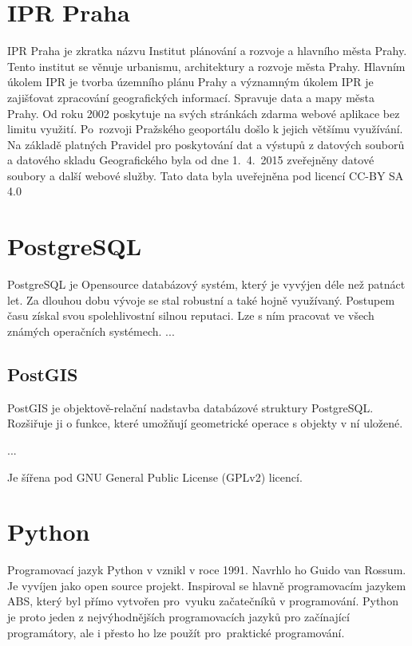 \section{IPR Praha}
\label{IPR Praha}
IPR Praha je zkratka názvu Institut plánování a rozvoje a hlavního města Prahy. 
Tento institut se věnuje urbanismu, architektury a rozvoje města Prahy. Hlavním
úkolem IPR je tvorba územního plánu Prahy a významným úkolem IPR je zajišťovat
zpracování geografických informací. Spravuje data a mapy města Prahy. Od roku 
2002 poskytuje na svých stránkách zdarma webové aplikace bez limitu využití. 
Po~rozvoji Pražského geoportálu došlo k jejich většímu využívání.  Na základě 
platných Pravidel pro poskytování dat a  výstupů z datových souborů a datového 
skladu Geografického byla od dne 1.~4.~2015 zveřejněny datové soubory a další 
webové služby. Tato data byla uveřejněna pod licencí CC-BY SA 4.0 \cite{IPR}


\section{PostgreSQL}
\label{PostgreSQL}
PostgreSQL je Opensource databázový systém, který je vyvýjen déle než patnáct
let. Za dlouhou dobu vývoje se stal robustní a také hojně využívaný.
Postupem času získal svou spolehlivostní silnou reputaci.
Lze s ním pracovat ve všech známých operačních systémech. ...
\cite{PostgreSQL}

\subsection{PostGIS}
\label{PostGIS}
PostGIS je objektově-relační nadstavba databázové struktury PostgreSQL.
Rozšiřuje ji o funkce, které umožňují geometrické operace s objekty v ní uložené.

...

Je šířena pod GNU General Public License (GPLv2) licencí.


\section{Python}
\label{Python}
Programovací jazyk Python v vznikl v roce 1991. Navrhlo ho Guido van Rossum. 
Je vyvíjen jako open source projekt. Inspiroval se hlavně programovacím jazykem
ABS, který byl přímo vytvořen pro~vyuku začatečníků v programování. Python je 
proto jeden z nejvýhodnějších programovacích jazyků pro začínající programátory,
ale i přesto ho lze použít pro~praktické programování. 

